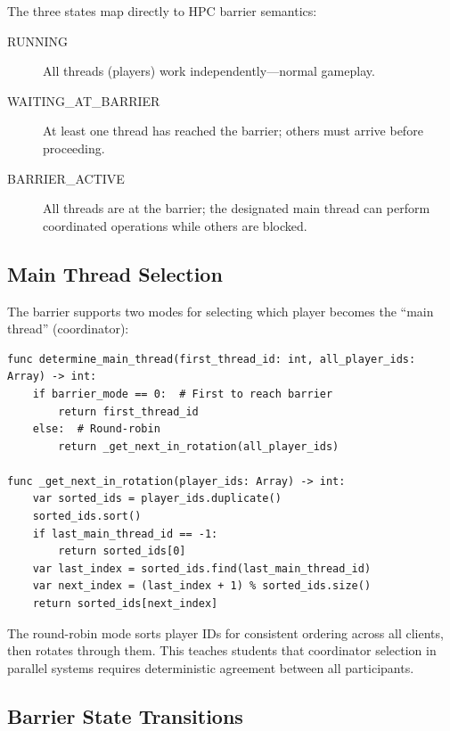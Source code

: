 The three states map directly to HPC barrier semantics:
\begin{description}
    \item[RUNNING] All threads (players) work independently---normal gameplay.
    \item[WAITING\_AT\_BARRIER] At least one thread has reached the barrier; others must arrive before proceeding.
    \item[BARRIER\_ACTIVE] All threads are at the barrier; the designated main thread can perform coordinated operations while others are blocked.
\end{description}

\subsection{Main Thread Selection}
\label{subsec:main-thread-selection}

The barrier supports two modes for selecting which player becomes the ``main thread'' (coordinator):

\begin{lstlisting}[caption={Main thread determination (barrier\_manager.gd)}]
func determine_main_thread(first_thread_id: int, all_player_ids: Array) -> int:
    if barrier_mode == 0:  # First to reach barrier
        return first_thread_id
    else:  # Round-robin
        return _get_next_in_rotation(all_player_ids)

func _get_next_in_rotation(player_ids: Array) -> int:
    var sorted_ids = player_ids.duplicate()
    sorted_ids.sort()
    if last_main_thread_id == -1:
        return sorted_ids[0]
    var last_index = sorted_ids.find(last_main_thread_id)
    var next_index = (last_index + 1) % sorted_ids.size()
    return sorted_ids[next_index]
\end{lstlisting}

The round-robin mode sorts player IDs for consistent ordering across all clients, then rotates through them. This teaches students that coordinator selection in parallel systems requires deterministic agreement between all participants.

\subsection{Barrier State Transitions}
\label{subsec:barrier-transitions}

